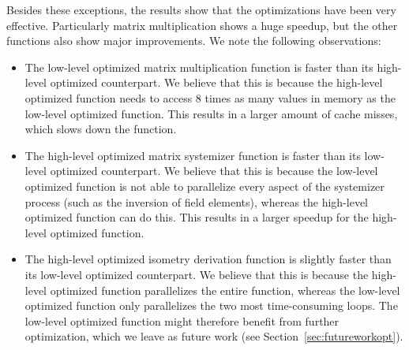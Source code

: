 \documentclass[11pt,a4paper]{report}
\theoremstyle{definition}
\begin{document}
Besides these exceptions, the results show that the optimizations have been very effective. Particularly matrix multiplication shows a huge speedup, but the other functions also show major improvements. We note the following observations:
\begin{itemize}
  \item The low-level optimized matrix multiplication function is faster than its high-level optimized counterpart. We believe that this is because the high-level optimized function needs to access 8 times as many values in memory as the low-level optimized function. This results in a larger amount of cache misses, which slows down the function.
  \item The high-level optimized matrix systemizer function is faster than its low-level optimized counterpart. We believe that this is because the low-level optimized function is not able to parallelize every aspect of the systemizer process (such as the inversion of field elements), whereas the high-level optimized function can do this. This results in a larger speedup for the high-level optimized function.
  \item The high-level optimized isometry derivation function is slightly faster than its low-level optimized counterpart. We believe that this is because the high-level optimized function parallelizes the entire function, whereas the low-level optimized function only parallelizes the two most time-consuming loops. The low-level optimized function might therefore benefit from further optimization, which we leave as future work (see Section~\ref{sec:futureworkopt}).
\end{itemize}
\end{document}

